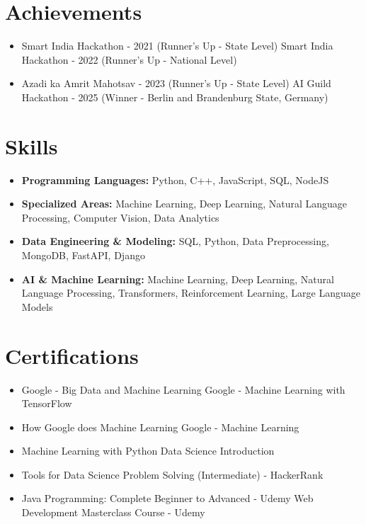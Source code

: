 \documentclass[a4paper,10pt]{article}
\begin{document}
\section*{Achievements}
\begin{itemize}
\item Smart India Hackathon - 2021 (Runner's Up - State Level) \hfill Smart India Hackathon - 2022 (Runner's Up - National Level)
\item Azadi ka Amrit Mahotsav - 2023 (Runner's Up - State Level) \hfill AI Guild Hackathon - 2025 (Winner - Berlin and Brandenburg State, Germany)
\end{itemize}

\section*{Skills}
\begin{itemize}
  \item \textbf{Programming Languages:} Python, C++, JavaScript, SQL, NodeJS
  \item \textbf{Specialized Areas:} Machine Learning, Deep Learning, Natural Language Processing, Computer Vision, Data Analytics
  \item \textbf{Data Engineering \& Modeling:} SQL, Python, Data Preprocessing, MongoDB, FastAPI, Django
  \item \textbf{AI \& Machine Learning:} Machine Learning, Deep Learning, Natural Language Processing, Transformers, Reinforcement Learning, Large Language Models
\end{itemize}

\section*{Certifications}
\begin{itemize}
\item Google - Big Data and Machine Learning \hfill Google - Machine Learning with TensorFlow
\item How Google does Machine Learning \hfill Google - Machine Learning
\item Machine Learning with Python \hfill Data Science Introduction
\item Tools for Data Science \hfill Problem Solving (Intermediate) - HackerRank
\item Java Programming: Complete Beginner to Advanced - Udemy \hfill Web Development Masterclass Course - Udemy
\end{itemize}
\end{document}
